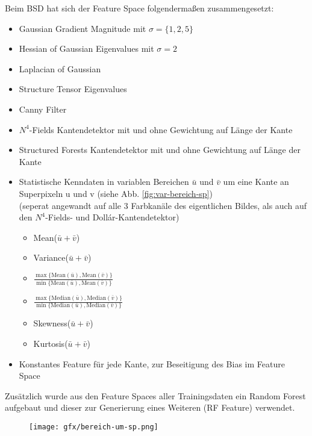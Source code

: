 Beim BSD hat sich der Feature Space folgendermaßen zusammengesetzt:

\begin{itemize}
	\item Gaussian Gradient Magnitude mit $\sigma=\{1, 2, 5\}$
	\item Hessian of Gaussian Eigenvalues mit $\sigma=2$
	\item Laplacian of Gaussian
	\item Structure Tensor Eigenvalues
	\item Canny Filter
	\item $N^4$-Fields Kantendetektor \cite{n4} mit und ohne Gewichtung auf Länge der Kante
	\item Structured Forests Kantendetektor \cite[Dollár et al.]{dollar} mit und ohne Gewichtung auf Länge der Kante
	\item Statistische Kenndaten in variablen Bereichen $\bar{u}$ und $\bar{v}$ um eine Kante an Superpixeln u und v (siehe Abb. \ref{fig:var-bereich-sp}) \\
	(seperat angewandt auf alle 3 Farbkanäle des eigentlichen Bildes, als auch auf den $N^4$-Fields- und Dollár-Kantendetektor)
	\begin{itemize}
		\item Mean($\bar{u} + \bar{v}$)
		\item Variance($\bar{u} + \bar{v}$)
		\item $\frac{\max{\{\text{Mean}(\bar{u}), \text{Mean}(\bar{v}) \}}}{\min{\{\text{Mean}(\bar{u}), \text{Mean}(\bar{v})}\}}$
		\item $\frac{\max{\{\text{Median}(\bar{u}), \text{Median}(\bar{v}) \}}}{\min{\{\text{Median}(\bar{u}), \text{Median}(\bar{v})}\}}$
		\item Skewness($\bar{u} + \bar{v}$)
		\item Kurtosis($\bar{u} + \bar{v}$)
	\end{itemize}
	\item Konstantes Feature für jede Kante, zur Beseitigung des Bias im Feature Space
\end{itemize}

Zusätzlich wurde aus den Feature Spaces aller Trainingsdaten ein Random Forest aufgebaut und dieser zur Generierung eines Weiteren (RF Feature) verwendet.

\vspace{1cm}

\begin{figure}[H]

	\texttt{[image: gfx/bereich-um-sp.png]}
\end{figure}
\label{fig:var-bereich-sp}
\vspace{1cm}

